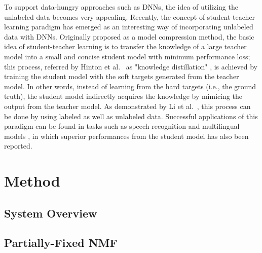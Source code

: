 \documentclass{article}
\begin{document}
To support data-hungry approaches such as DNNs, the idea of utilizing the unlabeled data becomes very appealing. Recently, the concept of student-teacher learning paradigm has emerged as an interesting way of incorporating unlabeled data with DNNs. Originally proposed as a model compression method, the basic idea of student-teacher learning is to transfer the knowledge of a large teacher model into a small and concise student model with minimum performance loss; this process, referred by Hinton et al.~ as "knowledge distillation" \cite{Hinton2015}, is achieved by training the student model with the soft targets generated from the teacher model. In other words, instead of learning from the hard targets (i.e., the ground truth), the student model indirectly acquires the knowledge by mimicing the output from the teacher model. As demonstrated by Li et al.~\cite{Li2014}, this process can be done by using labeled as well as unlabeled data. Successful applications of this paradigm can be found in tasks such as speech recognition \cite{Watanabe2017} and multilingual models \cite{Cui2017}, in which superior performances from the student model has also been reported.

\section{Method}\label{sec:method}
\subsection{System Overview}




\subsection{Partially-Fixed NMF}
\end{document}
